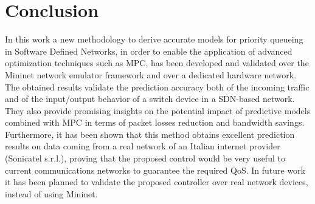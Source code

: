\chapter*{Conclusion} 
In this work a new methodology to derive accurate models for priority queueing in Software Defined Networks, in order to enable the application of advanced optimization techniques such as MPC, has been developed and validated over the Mininet network emulator framework and over a dedicated hardware network. The obtained results validate the prediction accuracy both of the incoming traffic and of the input/output behavior of a switch device in a SDN-based network. They also provide promising insights on the potential impact of predictive models combined with MPC in terms of packet losses reduction and bandwidth savings. Furthermore, it has been shown that this method obtains excellent prediction results on data coming from a real network of an Italian internet provider (Sonicatel s.r.l.), proving that the proposed control would be very useful to current communications networks to guarantee the required QoS. In future work it has been planned to validate the proposed controller over real network devices, instead of using Mininet.

